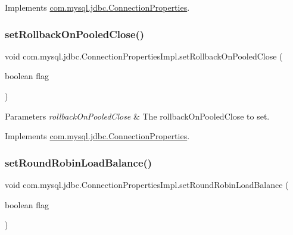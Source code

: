 Implements \mbox{\hyperlink{interfacecom_1_1mysql_1_1jdbc_1_1_connection_properties_a8ed305ab3368867b5a6cc1cc0bf67ba2}{com.\+mysql.\+jdbc.\+Connection\+Properties}}.

\mbox{\label{classcom_1_1mysql_1_1jdbc_1_1_connection_properties_impl_a187ec03b36f50445fb240336726772e6}} 
\subsubsection{\texorpdfstring{set\+Rollback\+On\+Pooled\+Close()}{setRollbackOnPooledClose()}}
{\footnotesize\ttfamily void com.\+mysql.\+jdbc.\+Connection\+Properties\+Impl.\+set\+Rollback\+On\+Pooled\+Close (\begin{DoxyParamCaption}\item[{boolean}]{flag }\end{DoxyParamCaption})}


\begin{DoxyParams}{Parameters}
{\em rollback\+On\+Pooled\+Close} & The rollback\+On\+Pooled\+Close to set. \\
\hline
\end{DoxyParams}


Implements \mbox{\hyperlink{interfacecom_1_1mysql_1_1jdbc_1_1_connection_properties_ac8700288ba51d4baf2062fa2a2856b88}{com.\+mysql.\+jdbc.\+Connection\+Properties}}.

\mbox{\label{classcom_1_1mysql_1_1jdbc_1_1_connection_properties_impl_ab6219b2405e2a9b5aae85fafacead1da}} 
\subsubsection{\texorpdfstring{set\+Round\+Robin\+Load\+Balance()}{setRoundRobinLoadBalance()}}
{\footnotesize\ttfamily void com.\+mysql.\+jdbc.\+Connection\+Properties\+Impl.\+set\+Round\+Robin\+Load\+Balance (\begin{DoxyParamCaption}\item[{boolean}]{flag }\end{DoxyParamCaption})}

